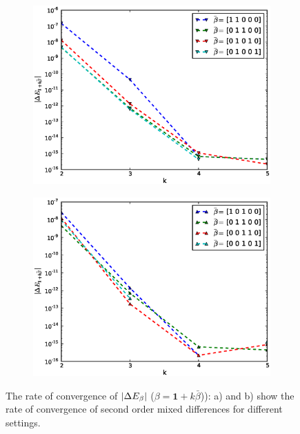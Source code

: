 \documentclass[11pt]{article}
\begin{document}
	\begin{figure}
	\centering
	\begin{subfigure}{.5\textwidth}
		\centering
		\includegraphics[width=1\linewidth]{./figures/mixed_difference_order2_basket_2.eps}
		\caption{}
		\label{fig:sub3}
	\end{subfigure}%
	\begin{subfigure}{.5\textwidth}
		\centering
		\includegraphics[width=1\linewidth]{./figures/mixed_difference_order2_basket_3.eps}
		\caption{}
		\label{fig:sub4}
	\end{subfigure}

	\caption{The rate of convergence of $\left\lvert\Delta E_{\beta}\right\rvert$ ($\beta=\mathbf{1}+k \bar{\beta}$)): a) and b) show  the rate of convergence of second order mixed differences for different settings.}
		\label{fig:test_basket_2}
\end{figure}
\end{document}
